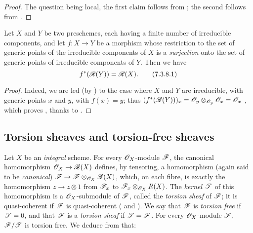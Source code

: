 \begin{proof}
\label{proof-1.7.3.7}
The question being local, the first claim follows from ; the second follows from .
\end{proof}

\begin{env}[7.3.8]
\label{1.7.3.8}
Let $X$ and $Y$ be two preschemes, each having a finite number of irreducible components, and let $f:X\to Y$ be a morphism whose restriction to the set of generic points of the irreducible components of $X$ is a \emph{surjection} onto the set of generic points of irreducible components of $Y$.
Then we have
\begin{equation*}
    f^*(\mathscr{R}(Y))=\mathscr{R}(X).
    \tag{7.3.8.1}
\end{equation*}
\end{env}

\begin{proof}
\label{proof-1.7.3.8}
Indeed, we are led (by ) to the case where $X$ and $Y$ are irreducible, with generic points $x$ and $y$, with $f(x)=y$; thus $(f^*(\mathscr{R}(Y)))_x=\mathscr{O}_y\otimes_{\mathscr{O}_y}\mathscr{O}_x=\mathscr{O}_x$ , which proves , thanks to .
\end{proof}

\subsection{Torsion sheaves and torsion-free sheaves}
\label{subsection-torsion-sheaves-and-torsion-free-sheaves}

\begin{env}[7.4.1]
\label{1.7.4.1}
Let $X$ be an \emph{integral} scheme.
For every $\mathscr{O}_X$-module $\mathscr{F}$, the canonical homomorphism $\mathscr{O}_X\to\mathscr{R}(X)$ defines, by tensoring, a homomorphism (again said to be \emph{canonical}) $\mathscr{F}\to\mathscr{F}\otimes_{\mathscr{O}_X}\mathscr{R}(X)$, which, on each fibre, is exactly the homomorphism $z\to z\otimes1$ from $\mathscr{F}_x$ to $\mathscr{F}_x\otimes_{\mathscr{O}_X}R(X)$.
The \emph{kernel $\mathscr{T}$} of this homomorphism is a $\mathscr{O}_X$-submodule of $\mathscr{F}$, called the \emph{torsion sheaf} of $\mathscr{F}$; it is quasi-coherent if $\mathscr{F}$ is quasi-coherent ( and ).
We say that $\mathscr{F}$ is \emph{torsion free} if $\mathscr{T}=0$, and that $\mathscr{F}$ is a \emph{torsion sheaf} if $\mathscr{T}=\mathscr{F}$.
For every $\mathscr{O}_X$-module $\mathscr{F}$, $\mathscr{F}/\mathscr{T}$ is torsion free.
We deduce from  that:
\end{env}

